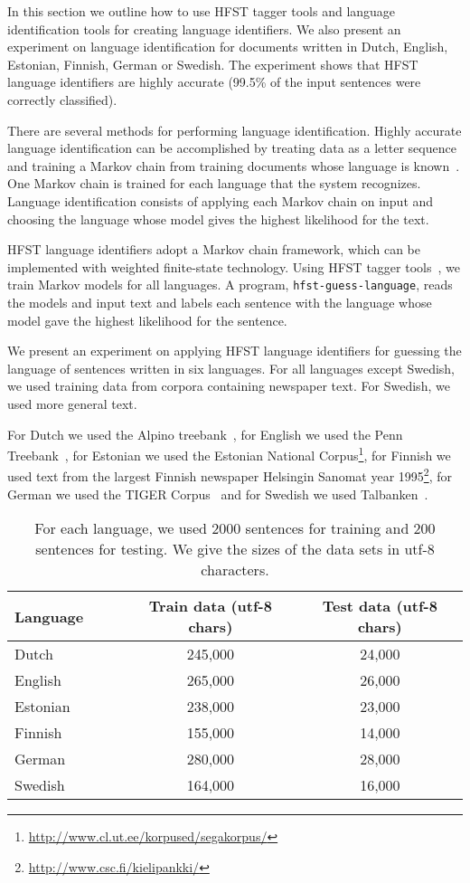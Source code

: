 \documentclass{llncs}
\begin{document}
In this section we outline how to use HFST tagger tools and language
identification tools for creating language identifiers. We also
present an experiment on language identification for documents written
in Dutch, English, Estonian, Finnish, German or Swedish. The
experiment shows that HFST language identifiers are highly accurate
(99.5\% of the input sentences were correctly classified).

There are several methods for performing language
identification. Highly accurate language identification can be
accomplished by treating data as a letter sequence and training
a Markov chain from training documents whose language is
known~\cite{cavnar/1994}. One Markov chain is trained for each
language that the system recognizes. Language identification consists
of applying each Markov chain on input and choosing the language whose
model gives the highest likelihood for the text. 

HFST language identifiers adopt a Markov chain framework, which can be
implemented with weighted finite-state technology. Using HFST tagger
tools~\cite{silfverberg/2011}, we train Markov models for all
languages. A program, {\tt hfst-guess-language}, reads the
models and input text and labels each sentence with the language
whose model gave the highest likelihood for the sentence.

We present an experiment on applying HFST language identifiers for
guessing the language of sentences written in six languages. For all
languages except Swedish, we used training data from corpora
containing newspaper text. For Swedish, we used more general text.

For Dutch we used the Alpino treebank~\cite{bouma/2000}, for English
we used the Penn Treebank~\cite{marcus/1993}, for Estonian we used the
Estonian National
Corpus\footnote{\url{http://www.cl.ut.ee/korpused/segakorpus/}}, for
Finnish we used text from the largest Finnish newspaper Helsingin
Sanomat year 1995\footnote{\url{http://www.csc.fi/kielipankki/}}, for
German we used the TIGER Corpus~\cite{brants/2002} and for Swedish we
used Talbanken~\cite{einarsson/1976}.

\begin{table}
\small
\begin{center}
\caption{For each language, we used 2000 sentences for training and
  200 sentences for testing. We give the sizes of the data sets in
  utf-8 characters.}\label{tab:lang-id-data}
\begin{tabular}{l|cc}
Language~~~~ & Train data (utf-8 chars) & Test data (utf-8 chars)\\
\hline
Dutch    & 245,000  & 24,000\\
English  & 265,000  & 26,000\\
Estonian & 238,000  & 23,000\\
Finnish  & 155,000  & 14,000\\
German   & 280,000  & 28,000\\
Swedish  & 164,000  & 16,000\\
\hline
\end{tabular}
\end{center}
\end{table}
\end{document}
